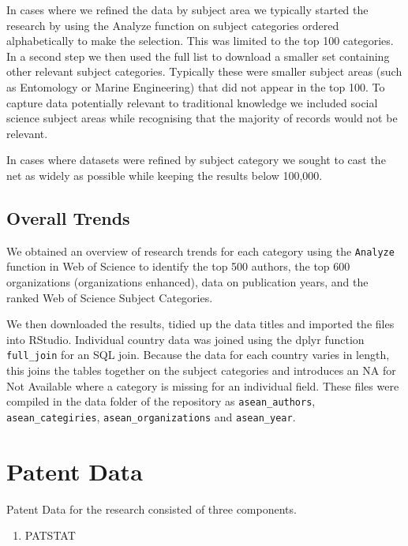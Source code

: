 \documentclass[openany]{book}
\providecommand{\tightlist}{%
  \setlength{\itemsep}{0pt}\setlength{\parskip}{0pt}}
\theoremstyle{definition}
\theoremstyle{definition}
\theoremstyle{definition}
\theoremstyle{remark}
\begin{document}
In cases where we refined the data by subject area we typically started
the research by using the Analyze function on subject categories ordered
alphabetically to make the selection. This was limited to the top 100
categories. In a second step we then used the full list to download a
smaller set containing other relevant subject categories. Typically
these were smaller subject areas (such as Entomology or Marine
Engineering) that did not appear in the top 100. To capture data
potentially relevant to traditional knowledge we included social science
subject areas while recognising that the majority of records would not
be relevant.

In cases where datasets were refined by subject category we sought to
cast the net as widely as possible while keeping the results below
100,000.

\hypertarget{overall-trends}{%
\subsection{Overall Trends}\label{overall-trends}}

We obtained an overview of research trends for each category using the
\texttt{Analyze} function in Web of Science to identify the top 500
authors, the top 600 organizations (organizations enhanced), data on
publication years, and the ranked Web of Science Subject Categories.

We then downloaded the results, tidied up the data titles and imported
the files into RStudio. Individual country data was joined using the
dplyr function \texttt{full\_join} for an SQL join. Because the data for
each country varies in length, this joins the tables together on the
subject categories and introduces an NA for Not Available where a
category is missing for an individual field. These files were compiled
in the data folder of the repository as \texttt{asean\_authors},
\texttt{asean\_categiries}, \texttt{asean\_organizations} and
\texttt{asean\_year}.

\hypertarget{patent-data}{%
\section{Patent Data}\label{patent-data}}

Patent Data for the research consisted of three components.

\begin{enumerate}
\def\labelenumi{\arabic{enumi}.}
\tightlist
\item
  PATSTAT
\end{enumerate}
\end{document}
